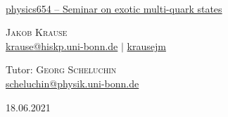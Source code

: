 \documentclass[11pt,aspectratio=1610,dvipsnames]{beamer}
\begin{document}
\begin{frame}[plain]
	\setcounter{framenumber}{0}
	\centering
	{\Large \color{MidnightBlue}{Experimental studies of the $\Lambda(1405)$}}\\
	{\href{https://www.youtube.com/watch?v=oHg5SJYRHA0}{physics654 -- Seminar on exotic multi-quark states}}
	

	\vfill

		



			
	\textsc{Jakob Krause}\\
	\scriptsize \href{mailto:krause@hiskp.uni-bonn.de}{\faEnvelope  \hspace*{0.1cm}krause@hiskp.uni-bonn.de} {\color{black}$|$} \href{https://github.com/krausejm}{\faGithub  \hspace*{0.1cm}krausejm}\\
	
	\vspace{.5cm}
	
	Tutor: \textsc{Georg Scheluchin}\\
	 \href{mailto:scheluchin@physik.uni-bonn.de}{\faEnvelope  \hspace*{0.1cm}scheluchin@physik.uni-bonn.de}

	\vspace{0.2cm}
	
	18.06.2021
	 	
 		
\end{frame}
\end{document}
